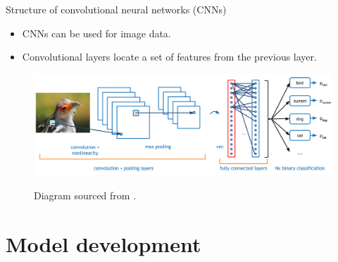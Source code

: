 \documentclass{beamer}
\begin{document}
\begin{frame}{Structure of convolutional neural networks (CNNs)}
\begin{itemize}
\item CNNs can be used for image data.
\item Convolutional layers locate a set of features from the previous layer.
\end{itemize}
\begin{figure}
\centering
\includegraphics[width=\linewidth]{../Thesis_Docs/Images/4_cnn_structure.png}

\small{Diagram sourced from \cite{ADeshpande2016}.}
\end{figure}
\end{frame}



\section{Model development}
\end{document}
